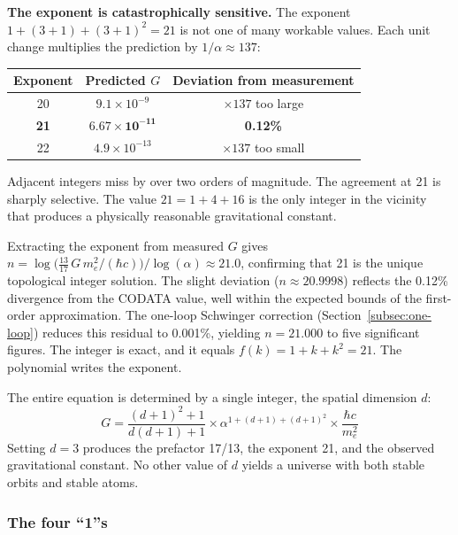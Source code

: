 \documentclass[aps,prd,preprint,superscriptaddress,showpacs,preprintnumbers,amsmath,amssymb,nofootinbib]{revtex4-2}
\begin{document}
\textbf{The exponent is catastrophically sensitive.} The exponent $1 + (3{+}1) + (3{+}1)^2 = 21$ is not one of many workable values. Each unit change multiplies the prediction by $1/\alpha \approx 137$:

\begin{center}
\begin{tabular}{ccc}
\toprule
\textbf{Exponent} & \textbf{Predicted $G$} & \textbf{Deviation from measurement} \\
\midrule
20 & $9.1 \times 10^{-9}$ & $\times 137$ too large \\
\textbf{21} & $\bm{6.67 \times 10^{-11}}$ & \textbf{0.12\%} \\
22 & $4.9 \times 10^{-13}$ & $\times 137$ too small \\
\bottomrule
\end{tabular}
\end{center}

Adjacent integers miss by over two orders of magnitude. The agreement at 21 is sharply selective. The value $21 = 1 + 4 + 16$ is the only integer in the vicinity that produces a physically reasonable gravitational constant.

Extracting the exponent from measured $G$ gives $n = \log\!\bigl(\tfrac{13}{17}\,G\,m_e^2/(\hbar c)\bigr) / \log(\alpha) \approx 21.0$, confirming that 21 is the unique topological integer solution. The slight deviation ($n \approx 20.9998$) reflects the 0.12\% divergence from the CODATA value, well within the expected bounds of the first-order approximation. The one-loop Schwinger correction (Section~\ref{subsec:one-loop}) reduces this residual to 0.001\%, yielding $n = 21.000$ to five significant figures. The integer is exact, and it equals $f(k) = 1 + k + k^2 = 21$. The polynomial writes the exponent.

The entire equation is determined by a single integer, the spatial dimension $d$:
\begin{equation}
G = \frac{(d+1)^2 + 1}{d(d+1) + 1} \times \alpha^{1 + (d+1) + (d+1)^2} \times \frac{\hbar c}{m_e^2}
\label{eq:G-general-d}
\end{equation}
Setting $d = 3$ produces the prefactor 17/13, the exponent 21, and the observed gravitational constant. No other value of $d$ yields a universe with both stable orbits and stable atoms.

\subsubsection*{The four ``1''s}
\end{document}
